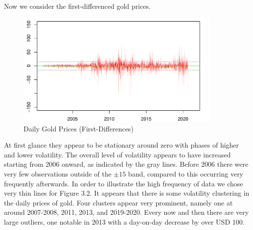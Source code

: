 \documentclass[a4paper]{article}
\theoremstyle{definition}
\begin{document}
Now we consider the first-differenced gold prices.
	\begin{figure}[!t]
	\centering
	\caption{Daily Gold Prices (First-Differences)}
	\includegraphics[width=0.90\textwidth]{goldFDHFalone.pdf}
	\end{figure}
At first glance they appear to be stationary around zero with phases of higher and lower volatility. The overall level of volatility appears to have increased starting from 2006 onward, as indicated by the gray lines. Before 2006 there were very few observations outside of the $\pm 15$ band, compared to this occurring very frequently afterwards. In order to illustrate the high frequency of data we chose very thin lines for Figure 3.2. It appears that there is some volatility clustering in the daily prices of gold. Four clusters appear very prominent, namely one at around 2007-2008, 2011, 2013, and 2019-2020. Every now and then there are very large outliers, one notable in 2013 with a day-on-day decrease by over USD 100.
\end{document}
